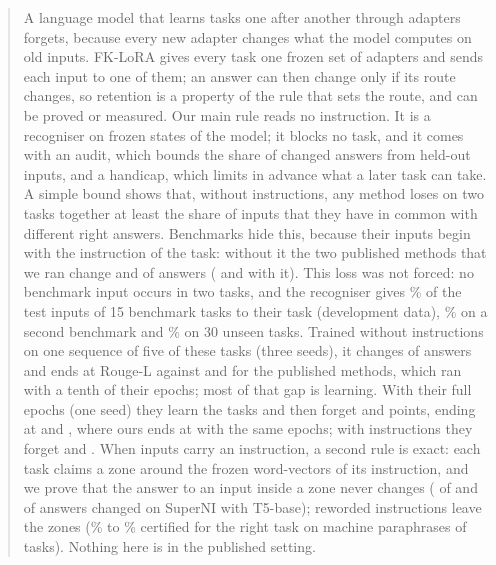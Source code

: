 \begin{abstract}
A language model that learns tasks one after another through adapters forgets, because every new
adapter changes what the model computes on old inputs. FK-LoRA gives every task one frozen set of
adapters and sends each input to one of them; an answer can then change only if its route changes,
so retention is a property of the rule that sets the route, and can be proved or measured. Our
main rule reads no instruction. It is a recogniser on frozen states of the model; it blocks no
task, and it comes with an audit, which bounds the share of changed answers from held-out inputs,
and a handicap, which limits in advance what a later task can take. A simple bound shows that,
without instructions, any method loses on two tasks together at least the share
of inputs that they have in common with different right answers. Benchmarks hide this, because
their inputs begin with the instruction of the task: without it the two published methods that we
ran change \AudSeedsGainloraChanged{} and \AudSeedsInfloraChanged{} of \AudSeedsCompared{} answers
(\FiveGainChanged{} and \FiveInfChanged{} with it). This loss was not forced: no benchmark input
occurs in two tasks, and the recogniser gives \AudDevLLamOneEnd{}\% of the test inputs of 15
benchmark tasks to their task (development data), \AudScaleLongThreeEnd{}\% on a second benchmark
and \AudFreshFourthLEnd{}\% on 30 unseen tasks. Trained without instructions on one sequence of
five of these tasks (three seeds), it changes \AudSeedsRidgeChanged{} of \AudSeedsCompared{}
answers and ends at \AudSeedsRidgeAPOne{} Rouge-L against \AudSeedsGainloraAPOne{} and
\AudSeedsInfloraAPOne{} for the published methods, which ran with a tenth of their epochs; most of
that gap is learning. With their full epochs (one seed) they learn the tasks and then forget
\AudFullGainloraFTInt{} and \AudFullInfloraFTInt{} points, ending at \AudFullGainloraAPOne{} and
\AudFullInfloraAPOne{}, where ours ends at \AudFullOursRidgeAPOne{} with the same epochs; with instructions they forget \AudFullDefOriginalGainloraFTOne{} and \AudFullDefOriginalInfloraFTOne{}. When inputs carry an instruction, a second rule is exact: each task
claims a zone around the frozen word-vectors of its instruction, and we prove that the answer to an
input inside a zone never changes (\FiveCertChanged{} of \FiveCertCompared{} and
\FifteenCertChanged{} of \FifteenCertCompared{} answers changed on SuperNI with T5-base); reworded
instructions leave the zones (\WidenRefTfivePLow{}\% to \WidenRefTfivePHigh{}\% certified for the
right task on machine paraphrases of \WidenTasksEval{} tasks). Nothing here is in the published
setting.
\end{abstract}
